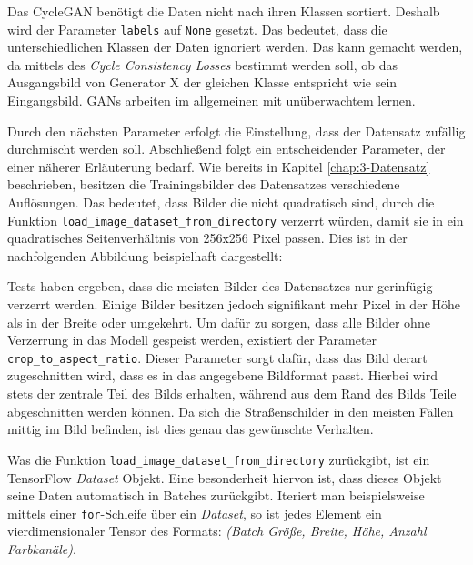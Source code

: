 
Das \ac{CycleGAN} benötigt die Daten nicht nach ihren Klassen sortiert. Deshalb wird der Parameter \texttt{labels} auf \texttt{None} gesetzt. Das bedeutet, dass die unterschiedlichen Klassen der Daten ignoriert werden. Das kann gemacht werden, da mittels des \emph{Cycle Consistency Losses} bestimmt werden soll, ob das Ausgangsbild von Generator X der gleichen Klasse entspricht wie sein Eingangsbild. \acp{GAN} arbeiten im allgemeinen mit unüberwachtem lernen.

Durch den nächsten Parameter erfolgt die Einstellung, dass der Datensatz zufällig durchmischt werden soll. Abschließend folgt ein entscheidender Parameter, der einer näherer Erläuterung bedarf. Wie bereits in Kapitel \ref{chap:3-Datensatz} beschrieben, besitzen die Trainingsbilder des Datensatzes verschiedene Auflösungen. Das bedeutet, dass Bilder die nicht quadratisch sind, durch die Funktion \texttt{load_image_dataset_from_directory} verzerrt würden, damit sie in ein quadratisches Seitenverhältnis von 256x256 Pixel passen. Dies ist in der nachfolgenden Abbildung beispielhaft dargestellt:


Tests haben ergeben, dass die meisten Bilder des Datensatzes nur gerinfügig verzerrt werden. Einige Bilder besitzen jedoch signifikant mehr Pixel in der Höhe als in der Breite oder umgekehrt. Um dafür zu sorgen, dass alle Bilder ohne Verzerrung in das Modell gespeist werden, existiert der Parameter \texttt{crop_to_aspect_ratio}. Dieser Parameter sorgt dafür, dass das Bild derart zugeschnitten wird, dass es in das angegebene Bildformat passt. Hierbei wird stets der zentrale Teil des Bilds erhalten, während aus dem Rand des Bilds Teile abgeschnitten werden können. Da sich die Straßenschilder in den meisten Fällen mittig im Bild befinden, ist dies genau das gewünschte Verhalten.

Was die Funktion \texttt{load_image_dataset_from_directory} zurückgibt, ist ein TensorFlow \emph{Dataset} Objekt. Eine besonderheit hiervon ist, dass dieses Objekt seine Daten automatisch in Batches zurückgibt. Iteriert man beispielsweise mittels einer \texttt{for}-Schleife über ein \emph{Dataset}, so ist jedes Element ein vierdimensionaler Tensor des Formats: \emph{(Batch Größe, Breite, Höhe, Anzahl Farbkanäle)}. \cite{tf-dataset}


